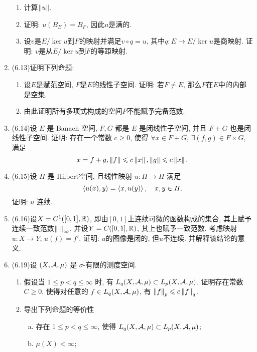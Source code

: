 \begin{enumerate}[label=\textbf{\arabic*.}, ref=\arabic*]
        \begin{enumerate}[(1)]
        \item 计算$ \left\| u \right\| $.
        \item 证明: $ u(B_E)=B_F $, 因此$ u $是满的.
        \item 设$ v $是$ E/\ker u $到$ F $的映射并满足$ v\circ q=u $, 其中$ q : E\to E/\ker u $是商映射. 证明: $ v $是从$ E/\ker u $到$ F $的等距映射.
        \end{enumerate}
    \item (6.13)证明下列命题:
        \begin{enumerate}[(1)]
        \item 设$ E $是赋范空间, $ F $是$ E $的线性子空间. 证明: 若$ F\ne E $, 那么$ F $在$ E $中的内部是空集.
        \item 由此证明所有多项式构成的空间$ P $不能赋予完备范数.
        \end{enumerate}
    \item (6.14)设 $ E $ 是 Banach 空间, $ F, G $ 都是 $ E $ 是闭线性子空间, 并且 $ F+G $ 也是闭线性子空间. 证明: 存在一个常数 $ c\geqslant0 $, 使得 $ \forall x\in F+G $, $ \exists(f, g)\in F\times G $, 满足
        \[
            x=f+g, \left\| f \right\|\leqslant c\left\| x \right\|, \left\| g \right\|\leqslant c\left\| x \right\|.
        \]
    \item (6.15)设 $ H $ 是 Hilbert空间, 且线性映射 $ u:H\to H $ 满足
        \[
            \left\langle u(x), y \right\rangle=\left\langle x, u(y) \right\rangle, \quad x, y\in H,
        \]
        证明: $ u $ 连续.
    \item (6.16)设$ X=C^1([0,1],\mathbb{R}) $, 即由$ [0,1] $上连续可微的函数构成的集合, 其上赋予连续一致范数$ \left\| \cdot \right\|_\infty $. 并设$ Y=C([0,1],\mathbb{R}) $, 其上也赋予一致范数. 考虑映射$ u : X\to Y $, $ u(f)=f' $. 证明: $ u $的图像是闭的, 但$ u $不连续. 并解释该结论的意义.
    \item (6.19)设 $ (X, \mathcal{A}, \mu) $ 是 $ \sigma $-有限的测度空间.
        \begin{enumerate}[(1)]
            \item 假设当 $ 1\leqslant p<q\leqslant\infty $ 时, 有 $ L_{q}(X, \mathcal{A}, \mu)\subset L_{p}(X, \mathcal{A}, \mu) $. 证明存在常数 $ C\geqslant0 $, 使得对任意的 $ f\in L_{q}(X, \mathcal{A}, \mu) $, 有 $ \left\| f \right\|_{p}\leqslant c\left\| f \right\|_{q} $.
            \item 导出下列命题的等价性
            \begin{enumerate}[a. ]
                \item 存在 $ 1\leqslant p<q\leqslant\infty $, 使得 $ L_{q}(X, \mathcal{A}, \mu)\subset L_{p}(X, \mathcal{A}, \mu) $;
                \item $ \mu(X)<\infty $;

\end{enumerate}
\end{enumerate}
\end{enumerate}
